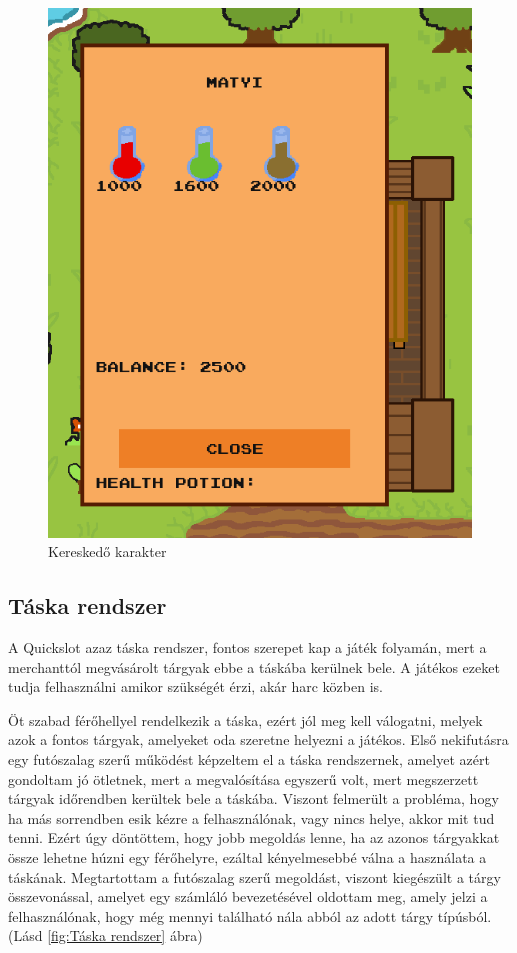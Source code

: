 \begin{figure}[H]
    \centering
    \includegraphics[width=9.0truecm]{images/merchant.png}
    \caption{Kereskedő karakter}
    \label{fig:Merchant}
\end{figure}


\subsection{Táska rendszer}

\indent \indent A Quickslot azaz táska rendszer, fontos szerepet kap a játék folyamán, mert a merchanttól megvásárolt tárgyak ebbe a táskába kerülnek bele. A játékos ezeket tudja felhasználni amikor szükségét érzi, akár harc közben is.

Öt szabad férőhellyel rendelkezik a táska, ezért jól meg kell válogatni, melyek azok a fontos tárgyak, amelyeket oda szeretne helyezni a játékos. Első nekifutásra egy futószalag szerű működést képzeltem el a táska rendszernek, amelyet azért gondoltam jó ötletnek, mert a megvalósítása egyszerű volt, mert megszerzett tárgyak időrendben kerültek bele a táskába. Viszont felmerült a probléma, hogy ha más sorrendben esik kézre a felhasználónak, vagy nincs helye, akkor mit tud tenni. Ezért úgy döntöttem, hogy jobb megoldás lenne, ha az azonos tárgyakkat össze lehetne húzni egy férőhelyre, ezáltal kényelmesebbé válna a használata a táskának. Megtartottam a futószalag szerű megoldást, viszont kiegészült a tárgy összevonással, amelyet egy számláló bevezetésével oldottam meg, amely jelzi a felhasználónak, hogy még mennyi található nála abból az adott tárgy típúsból. (Lásd \ref{fig:Táska rendszer} ábra)

